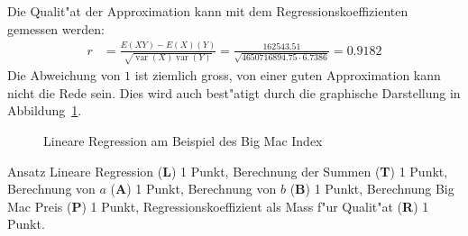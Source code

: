 \begin{loesung}
\begin{teilaufgaben}
\item
Die Qualit"at der Approximation kann mit dem Regressionskoeffizienten
gemessen werden:
\begin{align*}
r
&=
\frac{E(XY)-E(X)(Y)}{\sqrt{\operatorname{var}(X)\operatorname{var}(Y)}}
=\frac{162543.51}{\sqrt{
4650716894.75
\cdot
6.7386
}}
=0.9182
\end{align*}
Die Abweichung von $1$ ist ziemlich gross, von einer guten Approximation
kann nicht die Rede sein.
Dies wird auch best"atigt durch die graphische Darstellung in
Abbildung~\ref{40000037:lin}.
\begin{figure}
\centering
{}
\caption{Lineare Regression am Beispiel des Big Mac Index
\label{40000037:lin}}
\end{figure}
\end{teilaufgaben}
\end{loesung}

\begin{bewertung}
Ansatz Lineare Regression ({\bf L}) 1 Punkt,
Berechnung der Summen ({\bf T}) 1 Punkt,
Berechnung von $a$ ({\bf A}) 1 Punkt,
Berechnung von $b$ ({\bf B}) 1 Punkt,
Berechnung Big Mac Preis ({\bf P}) 1 Punkt,
Regressionskoeffizient als Mass f"ur Qualit"at ({\bf R}) 1 Punkt.
\end{bewertung}



